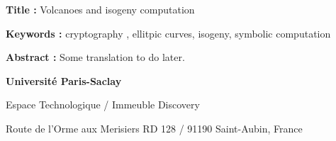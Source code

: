 \documentclass[a4paper, titlepage, 12pt]{book}
\newcommand{\titreeng}{Volcanoes and isogeny computation}
\begin{document}
\begin{breakbox}
\begin{multicols}{2}
%
\end{multicols}
\end{breakbox}


\begin{breakbox}

\noindent\textbf{Title : }\titreeng

\vspace{2ex}

\noindent\textbf{Keywords : }cryptography , ellitpic curves, isogeny, 
symbolic computation

\begin{multicols}{2}
\noindent\textbf{Abstract : }
Some translation to do later.
\end{multicols}
\end{breakbox}


{\tiny
\noindent
\textbf{Université Paris-Saclay}

\noindent
Espace Technologique / Immeuble Discovery

\noindent
Route de l’Orme aux Merisiers RD 128 / 91190 Saint-Aubin, France 

}
\end{document}
